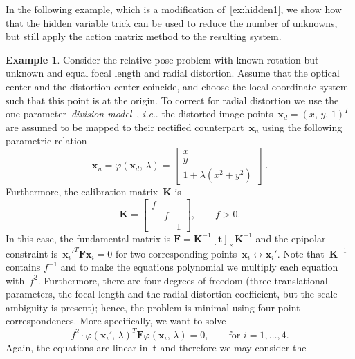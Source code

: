 \documentclass[11pt,a4paper]{article}
\makeatletter
\theoremstyle{definition}
\newtheorem{example}{Example}
\renewcommand{\phi}{\varphi}
\newcommand{\T}{T}
\newcommand{\te}[1]{\text{#1}}
\newcommand{\mat}[1]{\bm{#1}}
\DeclareRobustCommand\ie{\emph{i.e}\@ifnextchar.{}{.\@}}
\makeatother
\begin{document}
In the following example, which is a modification of~\cref{ex:hidden1}, we show how that
the hidden variable trick can be used to reduce the number of unknowns, but still
apply the action matrix method to the resulting system.

\begin{example}\label{ex:hidden3}
Consider the relative pose problem with known rotation but unknown and equal focal length and radial distortion.
Assume that the optical center and the distortion center coincide, and choose the local
coordinate system such that this point is at the origin. To correct for radial distortion we use
the one-parameter~\emph{division model}~\cite{fitzgibbon2001}, \ie{} the distorted
image points~$\mat{x}_d=(x,\,y,\,1)^\T$ are assumed to be mapped to their rectified counterpart~$\mat{x}_u$
using the following parametric relation
\begin{equation}
    \mat{x}_u = \phi(\mat{x}_d,\,\lambda) =
    \begin{bmatrix}
        x \\
        y \\
        1 + \lambda(x^2+y^2)
    \end{bmatrix}\;.
\end{equation}
Furthermore, the calibration matrix~$\mat{K}$ is
\begin{equation}
    \mat{K} = \begin{bmatrix}
    f\\ & f\\ && 1
    \end{bmatrix}, \qquad f > 0.
\end{equation}
In this case, the fundamental matrix is $\mat{F} = \mat{K}^{-1}[\mat{t}]_\times\mat{K}^{-1}$
and the epipolar constraint is~$\mat{x}_i'^\T\mat{Fx}_i = 0$ for two corresponding
points~$\mat{x}_i\leftrightarrow\mat{x}_i'$. Note that~$\mat{K}^{-1}$ contains $f^{-1}$ and
to make the equations polynomial we multiply each equation with~$f^2$. Furthermore, there
are four degrees of freedom (three translational parameters, the focal length and the radial
distortion coefficient, but the scale ambiguity is present); hence, the problem is minimal using four point correspondences.
More specifically, we want to solve
\begin{equation}
    f^2\cdot \phi(\mat{x}_i',\,\lambda)^\T \mat{F} \phi(\mat{x}_i,\,\lambda) = 0, \qquad \te{for }i=1,\ldots, 4.
\end{equation}
Again, the equations are linear in~$\mat{t}$ and therefore we may consider the

\end{example}
\end{document}
